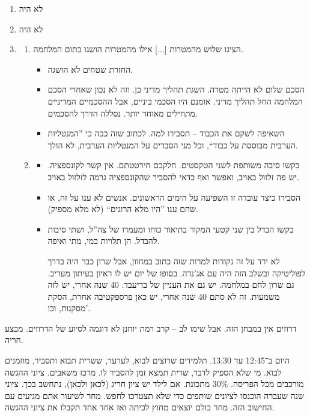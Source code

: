 \documentclass[]{../../../../tex/classes/styledArticle}
\begin{document}
\begin{enumerate}
		\begin{enumerate}[A']
			\item מלחמה קרה באה בחלק הפוליטי ובחלק האידיאולוגי. כנל על הנושא הלאומי. זה הסברים שונים. 
			\item שאלו על היהודים, לא הייתה בעיה. נקודה אחת – פאן־ערביות זה לא דתי, אלא לאומי. 
		\end{enumerate}
		\item לא היה
		\item לא היה
		\item \begin{enumerate}[A']
			\item הציגו שלוש מהמטרות [...] אילו מהמטרות הושגו בתום המלחמה. 
			\begin{itemize}
				\item החזרת שטחים לא הושגה. 
				\item הסכם שלום לא הייתה מטרה. השגת תהליך מדיני כן. וזה לא נכון שאחרי הסכם המלחמה החל תהליך מדיני. אומנם היו הסכמי ביניים, אבל ההסכמיים המדיניים מתחילים מאוחר יותר. נסללה הדרך להסכמים. 
				\item השאיפה לשקם את הכבוד – תסבירו למה. לכתוב שזה ככה כי ''המנטליות הערבית מבוססת על כבוד``, וכל מני הסברים על המנטליות הערבית, לא הולך. 
			\end{itemize}
			\item \begin{itemize}
				\item בקשו סיבה משותפת לשני הטקסטים. חלקכם חירטטתם. אין קשר לקונספציה. יש פה זלזול באויב, ואפשר ואף כדאי להסביר שהקונספציה גרמה לזלזול באויב. 
				\item הסבירו כיצד עובדה זו השפיעה על הימים הראשונים. אנשים לא ענו על זה, או שהם ענו ''היו מלא הרוגים`` (לא מלא מספיק). 
				\item בקשו הבדל בין שני קטעי המקור בתיאור כוחו ומעמדו של צה''ל, ושתי סיבות להבדל. הן תלויות במי, מתי ואיפה. 
				
				לא ירד על זה נקודות למרות שזה כתוב במחוון, אבל שרון כבר היה בדרך לפוליטיקה ובשלב הזה היה עם אג'נדה. בסופו של יום יש לו ראיון בעיתון מעריב. גם שרון לחם במלחמה. יש גם את העניין של בדיעבד. 40 שנה אחרי, יש לזה משמעות. זה לא סתם 40 שנה אחרי, יש כאן פרספקטיבה אחרת, הסקת מסקנות, וכו'. 
			\end{itemize}
		\end{enumerate}
	\end{enumerate}
	
	דרוזים אין במבחן הזה. אבל שימו לב – קרב רמת יוחנן לא דוגמה לסיוע של הדרוזים. מבצע חריה. 
	
	היום ב־12:45 עד 13:30. תלמידים שרוצים לבוא, לערער, ששרית תבוא ותסביר, מוזמנים לבוא. מי שלא הספיק לדבר, שרית תמצא זמן להסביר לו. מרכז משאבים. ציוני ההגשה מורכבים מכל הפריסה. 30\% מתכונת. אם לילד יש ציון חריג (לכאן ולכאן), נתחשב בכך. ציוני שנה שעברה הוכנסו לציונים שותפים כדי שלא תצטרכו לחפש. מחר לשיעור אתם מגיעים עם החישוב הזה. מחר כולם יוצאים מחוץ לכיתה ואז אחד אחד תקבלו את ציוני ההגשה. 
	
\end{document}
